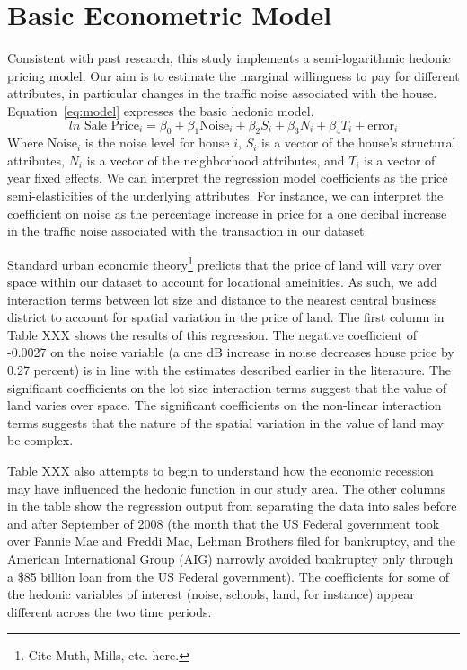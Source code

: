 \documentclass{article}\usepackage{graphicx, color}
\begin{document}
\section{Basic Econometric Model}\label{basicModel}
Consistent with past research, this study implements a semi-logarithmic hedonic pricing model. Our aim is to estimate the marginal willingness to pay for different attributes, in particular changes in the traffic noise associated with the house. Equation~\eqref{eq:model} expresses the basic hedonic model.
\begin{equation}\label{eq:model}	
ln \textrm{ Sale Price}_i = \beta _0 + \beta _1 \textrm{Noise}_i+ \beta _2 S_i+ \beta _3 N_i + \beta _4 T_i + \textrm{error}_i
\end{equation}
Where Noise$_i$ is the noise level for house $i$, $S_i$ is a vector of the house's structural attributes, $N_i$ is a vector of the neighborhood attributes, and $T_i$ is a vector of year fixed effects. We can interpret the regression model coefficients as the price semi-elasticities of the underlying attributes. For instance, we can interpret the coefficient on noise as the percentage increase in price for a one decibal increase in the traffic noise associated with the transaction in our dataset. 

Standard urban economic theory\footnote{Cite Muth, Mills, etc. here.} predicts that the price of land will vary over space within our dataset to account for locational ameinities. As such, we add interaction terms between lot size and distance to the nearest central business district to account for spatial variation in the price of land. The first column in Table XXX shows the results of this regression. The negative coefficient of -0.0027 on the noise variable (a one dB increase in noise decreases house price by 0.27 percent) is in line with the estimates described earlier in the literature. The significant coefficients on the lot size interaction terms suggest that the value of land varies over space. The significant coefficients on the non-linear interaction terms suggests that the nature of the spatial variation in the value of land may be complex.

Table XXX also attempts to begin to understand how the economic recession may have influenced the hedonic function in our study area. The other columns in the table show the regression output from separating the data into sales before and after September of 2008 (the month that the US Federal government took over Fannie Mae and Freddi Mac, Lehman Brothers filed for bankruptcy, and the American International Group (AIG) narrowly avoided bankruptcy only through a \$85 billion loan from the US Federal government). The coefficients for some of the hedonic variables of interest (noise, schools, land, for instance) appear different across the two time periods.
\end{document}
